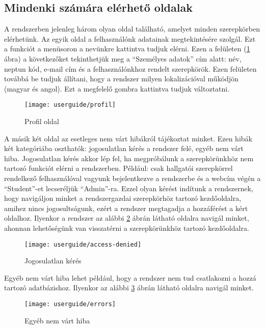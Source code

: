\subsection{Mindenki számára elérhető oldalak}
\label{step:mindenkinek-elerheto-oldal}
A rendszerben jelenleg három olyan oldal található, amelyet minden szerepkörben elérhetünk. Az egyik oldal a felhasználónk adatainak megtekintésére szolgál. Ezt a funkciót a menüsoron a nevünkre kattintva tudjuk elérni. Ezen a felületen (\ref{fig:profile} ábra) a következőket tekinthetjük meg a ``Személyes adatok'' cím alatt: név, neptun kód, e-mail cím és a felhasználónkhoz rendelt szerepkörök. Ezen felületen továbbá be tudjuk állítani, hogy a rendszer milyen lokalizációval működjön (magyar és angol). Ezt a megfelelő gombra kattintva tudjuk változtatni.
\begin{figure}[H]
	\centering
	\texttt{[image: userguide/profil]}
	\caption{Profil oldal}
	\label{fig:profile}
\end{figure}
A másik két oldal az esetleges nem várt hibákról tájékoztat minket. Ezen hibák két kategóriába oszthatók: jogosulatlan kérés a rendszer felé, egyéb nem várt hiba. Jogosulatlan kérés akkor lép fel, ha megpróbálunk a szerepkörünkhöz nem tartozó funkciót elérni a rendszerben. Például: csak hallgatói szerepkörrel rendelkező felhasználóval vagyunk bejelentkezve a rendszerbe és a webcím végén a ``Student''-et lecseréljük ``Admin''-ra. Ezzel olyan kérést indítunk a rendszernek, hogy navigáljon minket a rendszergazdai szerepkörhöz tartozó kezdőoldalra, amihez nincs jogosultságunk, ezért a rendszer megtagadja a hozzáférést a kért oldalhoz. Ilyenkor a rendszer az alábbi \ref{fig:access-denied} ábrán látható oldalra navigál minket, ahonnan lehetőségünk van visszatérni a szerepkörünkhöz tartozó kezdőoldalra.
\begin{figure}[H]
	\centering
	\texttt{[image: userguide/access-denied]}
	\caption{Jogosulatlan kérés}
	\label{fig:access-denied}
\end{figure}
Egyéb nem várt hiba lehet például, hogy a rendszer nem tud csatlakozni a hozzá tartozó adatbázishoz. Ilyenkor az alábbi \ref{fig:errors} ábrán látható oldalra navigál minket.
\begin{figure}[H]
	\centering
	\texttt{[image: userguide/errors]}
	\caption{Egyéb nem várt hiba}
	\label{fig:errors}
\end{figure}